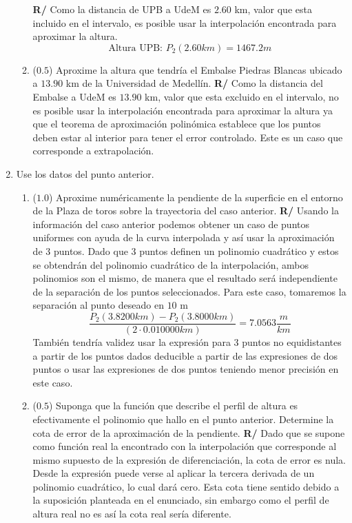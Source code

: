 \documentclass[12pt]{article}
\begin{document}
\begin{enumerate}[leftmargin=*,widest=9]
\begin{enumerate}[label=\alph*]
\textbf{R/} Como la distancia de UPB a UdeM es \(2.60\) km, valor que esta incluido en el intervalo, es posible usar la interpolación encontrada para aproximar la altura.
\[ \text{Altura UPB: } P_2(2.60km) = 1467.2 m \]
    \item (\(0.5\)) Aproxime la altura que tendría el Embalse Piedras Blancas ubicado a \(13.90\) km de la Universidad de Medellín. %
\textbf{R/} Como la distancia del Embalse a UdeM es \(13.90\) km, valor que esta excluido en el intervalo, no es posible usar la interpolación encontrada para aproximar la altura ya que el teorema de aproximación polinómica establece que los puntos deben estar al interior para tener el error controlado. Este es un caso que corresponde a extrapolación. %
\end{enumerate}
   \item Use los datos del punto anterior.
   \begin{enumerate}[label=\alph*]
   \item (\(1.0\)) Aproxime numéricamente la pendiente de la superficie en el entorno de la Plaza de toros sobre la trayectoria del caso anterior.
\textbf{R/} Usando la información del caso anterior podemos obtener un caso de puntos uniformes con ayuda de la curva interpolada y así usar la aproximación de 3 puntos.
Dado que 3 puntos definen un polinomio cuadrático y estos se obtendrán del polinomio cuadrático de la interpolación, ambos polinomios son el mismo, de manera que el resultado será independiente de la separación de los puntos seleccionados. Para este caso, tomaremos la separación al punto deseado en \(10\) m
\[ \frac{P_2(3.8200 km) - P_2(3.8000 km)}{(2 \cdot 0.010000 km)} = 7.0563 \frac{m}{km}\]
También tendría validez usar la expresión para 3 puntos no equidistantes a partir de los puntos dados deducible a partir de las expresiones de dos puntos o usar las expresiones de dos puntos teniendo menor precisión en este caso.
   \item (\(0.5\)) Suponga que la función que describe el perfil de altura es efectivamente el polinomio que hallo en el punto anterior. Determine la cota de error de la aproximación de la pendiente.
   \textbf{R/} Dado que se supone como función real la encontrado con la interpolación que corresponde al mismo supuesto de la expresión de diferenciación, la cota de error es nula. Desde la expresión puede verse al aplicar la tercera derivada de un polinomio cuadrático, lo cual dará cero.
   Esta cota tiene sentido debido a la suposición planteada en el enunciado, sin embargo como el perfil de altura real no es así la cota real sería diferente.
   \end{enumerate}
\end{enumerate}
\end{document}
